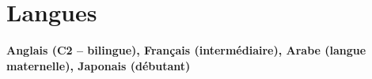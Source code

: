 \section{Langues}
\resumeSubHeadingListStart
\item \textbf{Anglais (C2 – bilingue), Français (intermédiaire), Arabe (langue maternelle), Japonais (débutant)}
\resumeSubHeadingListEnd
